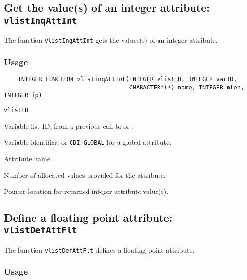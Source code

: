 \subsection{Get the value(s) of an integer attribute: {\tt vlistInqAttInt}}
\label{vlistInqAttInt}

The function {\tt vlistInqAttInt} gets the values(s) of an integer attribute.

\subsubsection*{Usage}

\begin{verbatim}
    INTEGER FUNCTION vlistInqAttInt(INTEGER vlistID, INTEGER varID, 
                                    CHARACTER*(*) name, INTEGER mlen, INTEGER ip)
\end{verbatim}

\hspace*{4mm}\begin{minipage}[]{15cm}
\begin{deflist}{\tt vlistID\ }
\item[{\tt vlistID}]
Variable list ID, from a previous call to {} or {}.
\item[{\tt varID}]
Variable identifier, or {\tt CDI\_GLOBAL} for a global attribute.
\item[{\tt name}]
Attribute name.
\item[{\tt mlen}]
Number of allocated values provided for the attribute.
\item[{\tt ip}]
Pointer location for returned integer attribute value(s).

\end{deflist}
\end{minipage}


\subsection{Define a floating point attribute: {\tt vlistDefAttFlt}}
\label{vlistDefAttFlt}

The function {\tt vlistDefAttFlt} defines a floating point attribute.

\subsubsection*{Usage}

